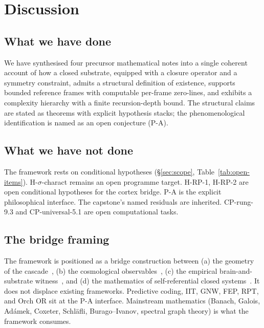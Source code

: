 \documentclass[11pt]{article}
\theoremstyle{plain}
\theoremstyle{definition}
\theoremstyle{remark}
\begin{document}
\section{Discussion}\label{sec:discussion}

\subsection{What we have done}

We have synthesised four precursor mathematical notes into a single coherent account of how a closed substrate, equipped with a closure operator and a symmetry constraint, admits a structural definition of existence, supports bounded reference frames with computable per-frame zero-lines, and exhibits a complexity hierarchy with a finite recursion-depth bound. The structural claims are stated as theorems with explicit hypothesis stacks; the phenomenological identification is named as an open conjecture (P-A).

\subsection{What we have not done}

The framework rests on conditional hypotheses (\S\ref{sec:scope}, Table~\ref{tab:open-items}). H-$\sigma$-charact remains an open programme target. H-RP-1, H-RP-2 are open conditional hypotheses for the cortex bridge. P-A is the explicit philosophical interface. The capstone's named residuals are inherited. CP-rung-9.3 and CP-universal-5.1 are open computational tasks.

\subsection{The bridge framing}

The framework is positioned as a bridge construction between (a) the geometry of the cascade~\citep{SmartXXXVI}, (b) the cosmological observables~\citep{SmartHypersphereCosmology}, (c) the empirical brain-and-substrate witness~\citep{SmartAriaChess2026}, and (d) the mathematics of self-referential closed systems~\citep{SmartCapstone}. It does not displace existing frameworks. Predictive coding, IIT, GNW, FEP, RPT, and Orch OR sit at the P-A interface. Mainstream mathematics (Banach, Galois, Adámek, Coxeter, Schl\"afli, Burago--Ivanov, spectral graph theory) is what the framework consumes.
\end{document}
